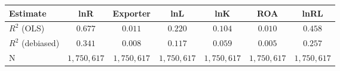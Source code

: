 \begin{tabular}{l*{6}{c}}
\hline\hline
 Estimate & lnR & Exporter & lnL & lnK & ROA & lnRL \\
\hline
\addlinespace $ R^2$ (OLS) & $0.677$ & $0.011$ & $0.220$ & $0.104$ & $0.010$ & $0.458$ \\
$ R^2$ (debiased) & $0.341$ & $0.008$ & $0.117$ & $0.059$ & $0.005$ & $0.257$ \\
N & $1,750,617$ & $1,750,617$ & $1,750,617$ & $1,750,617$ & $1,750,617$ & $1,750,617$ \\
\hline\hline
\end{tabular}
